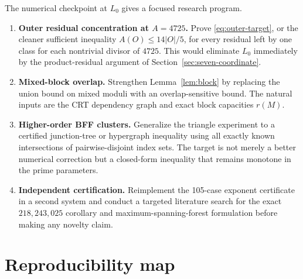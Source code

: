 \documentclass[11pt]{article}
\theoremstyle{definition}
\begin{document}
The numerical checkpoint at $L_0$ gives a focused research program.

\begin{enumerate}[label=\arabic*.]
\item \textbf{Outer residual concentration at $A=4725$.}  Prove
\eqref{eq:outer-target}, or the cleaner sufficient inequality
$A(O)\le14|O|/5$, for every residual left by one class for each nontrivial divisor of $4725$.
This would eliminate $L_0$ immediately by the product-residual argument of
Section~\ref{sec:seven-coordinate}.

\item \textbf{Mixed-block overlap.}  Strengthen Lemma~\ref{lem:block} by replacing the union
bound on mixed moduli with an overlap-sensitive bound.  The natural inputs are the CRT
dependency graph and exact block capacities $r(M)$.

\item \textbf{Higher-order BFF clusters.}  Generalize the triangle experiment to a certified
junction-tree or hypergraph inequality using all exactly known intersections of pairwise-disjoint
index sets.  The target is not merely a better numerical correction but a closed-form inequality
that remains monotone in the prime parameters.

\item \textbf{Independent certification.}  Reimplement the 105-case exponent certificate in a
second system and conduct a targeted literature search for the exact $218{,}243{,}025$ corollary
and maximum-spanning-forest formulation before making any novelty claim.
\end{enumerate}

\section{Reproducibility map}
\end{document}
